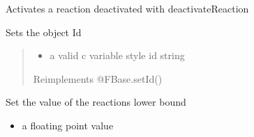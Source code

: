 \documentclass[letterpaper,10pt,english]{sphinxmanual}
\begin{document}
\begin{fulllineitems}
\begin{fulllineitems}
\label{\detokenize{modules_doc:cbmpy.CBModel.Reaction.reactivateReaction}}
\pysigstartsignatures
{}
\pysigstopsignatures
\sphinxAtStartPar
Activates a reaction deactivated with deactivateReaction

\end{fulllineitems}


\begin{fulllineitems}
\label{\detokenize{modules_doc:cbmpy.CBModel.Reaction.setId}}
\pysigstartsignatures
{}
\pysigstopsignatures
\sphinxAtStartPar
Sets the object Id
\begin{quote}
\begin{itemize}
\item {} 
\sphinxAtStartPar
{} a valid c variable style id string

\end{itemize}

\sphinxAtStartPar
Reimplements @FBase.setId()
\end{quote}

\end{fulllineitems}


\begin{fulllineitems}
\label{\detokenize{modules_doc:cbmpy.CBModel.Reaction.setLowerBound}}
\pysigstartsignatures
{}
\pysigstopsignatures
\sphinxAtStartPar
Set the value of the reactions lower bound
\begin{itemize}
\item {} 
\sphinxAtStartPar
{} a floating point value

\end{itemize}

\end{fulllineitems}



\end{fulllineitems}
\end{document}
